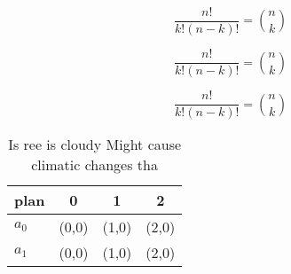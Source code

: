 \documentclass[a4paper]{article}
\begin{document}
\[ \frac{n!}{k!(n-k)!} = \binom{n}{k} \]

\[ \frac{n!}{k!(n-k)!} = \binom{n}{k} \]

\[ \frac{n!}{k!(n-k)!} = \binom{n}{k} \]

\begin{table}
\begin{adjustbox}{width=0.6\columnwidth}
\begin{tabular}{|l|l|l|l|}
\hline
\textbf{plan} & \multicolumn{1}{c|}{\textbf{0}} & \multicolumn{1}{c|}{\textbf{1}} & \multicolumn{1}{c|}{\textbf{2}} \\ \hline
\textbf{$a_0$}  & (0,0) & (1,0) & (2,0) \\ \hline
\textbf{$a_1$}  & (0,0) & (1,0) & (2,0) \\ \hline
\end{tabular}
\end{adjustbox}
\caption{Is ree is cloudy Might cause climatic changes tha
}
\end{table}
\end{document}
